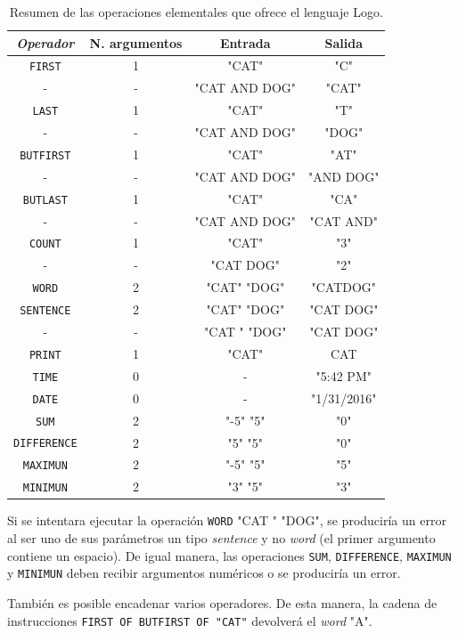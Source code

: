\begin{table}[!ht]
	\begin{centering}
		\begin{tabular}{c|c|c|c}
\emph{Operador} & N. argumentos & Entrada & Salida\\
\hline
\texttt{FIRST}	& 1 & "CAT" & "C"\\
- & - & "CAT AND DOG" & "CAT"\\
\texttt{LAST} & 1 & "CAT" & "T"\\
- & - & "CAT AND DOG" & "DOG"\\
\texttt{BUTFIRST} &1& "CAT" & "AT"\\
- & - & "CAT AND DOG" & "AND DOG"\\
\texttt{BUTLAST} & 1 & "CAT" & "CA"\\
- & - & "CAT AND DOG" & "CAT AND"\\
\texttt{COUNT} & 1 & "CAT" & "3"\\
- & - & "CAT DOG" & "2"\\
\texttt{WORD}& 2 & "CAT" "DOG" & "CATDOG"\\
\texttt{SENTENCE}& 2 & "CAT" "DOG" & "CAT DOG"\\
- & - & "CAT " "DOG" & "CAT DOG"\\
\texttt{PRINT} & 1 & "CAT" & CAT\\
\texttt{TIME} & 0 & - & "5:42 PM"\\
\texttt{DATE} & 0 & - & "1/31/2016"\\
\texttt{SUM} & 2 & "-5" "5" & "0"\\
\texttt{DIFFERENCE} & 2 & "5" "5"& "0"\\
\texttt{MAXIMUN} & 2 & "-5" "5" & "5"\\
\texttt{MINIMUN} & 2 & "3" "5"& "3"\\
\end{tabular}
	\caption{Resumen de las operaciones elementales que ofrece el lenguaje Logo.}
		\label{tab:logo-operaciones}
	\end{centering}
\end{table}

Si se intentara ejecutar la operación \texttt{WORD} "CAT " "DOG", se produciría un error al ser uno de sus parámetros un tipo \emph{sentence} y no \emph{word} (el primer argumento contiene un espacio). De igual manera, las operaciones \texttt{SUM}, \texttt{DIFFERENCE}, \texttt{MAXIMUN} y \texttt{MINIMUN} deben recibir argumentos numéricos o se produciría un error.

También es posible encadenar varios operadores. De esta manera, la cadena de instrucciones \texttt{FIRST OF BUTFIRST OF "CAT"} devolverá el \emph{word} "A".


